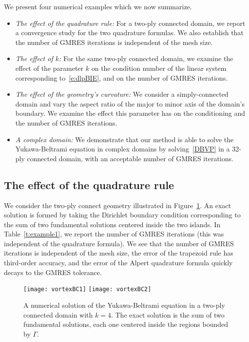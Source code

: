 \documentclass[final]{siamltex}
\begin{document}
We present four numerical examples which we now summarize.
\begin{itemize}
  \item{\em{The effect of the quadrature rule}:} For a two-ply connected
  domain, we report a convergence study for the two quadrature formulas.
  We also establish that the number of GMRES iterations is independent
  of the mesh size.

  \item{\em{The effect of $k$}:} For the same two-ply connected domain,
  we examine the effect of the parameter $k$ on the condition number of
  the linear system corresponding to~\eqref{e:dlpBIE}, and on the number
  of GMRES iterations.

  \item{\em{The effect of the geometry's curvature}:} We consider a
  simply-connected domain and vary the aspect ratio of the major to
  minor axis of the domain's boundary.  We examine the effect this
  parameter has on the conditioning and the number of GMRES iterations.

  \item{\em{A complex domain}:} We demonstrate that our method is able
  to solve the Yukawa-Beltrami equation in complex domains by
  solving~\eqref{DBVP} in a 32-ply connected domain, with an acceptable
  number of GMRES iterations.
\end{itemize}


\subsection{The effect of the quadrature rule}
We consider the two-ply connect geometry illustrated in
Figure~\ref{f:twoply}.  An exact solution is formed by taking the
Dirichlet boundary condition corresponding to the sum of two fundamental
solutions centered inside the two islands.  In Table~\ref{t:example1},
we report the number of GMRES iterations (this was independent of the
quadrature formula).  We see that the number of GMRES iterations is
independent of the mesh size, the error of the trapezoid rule has
third-order accuracy, and the error of the Alpert quadrature formula
quickly decays to the GMRES tolerance.

\begin{figure}[htps]
  \texttt{[image: vortexBC1]}
  \texttt{[image: vortexBC2]}
\caption{\label{f:twoply} A numerical solution of the Yukawa-Beltrami
equation in a two-ply connected domain with $k=4$.  The exact solution
is the sum of two fundamental solutions, each one centered inside the
regions bounded by $\Gamma$.}
\end{figure}
\end{document}
